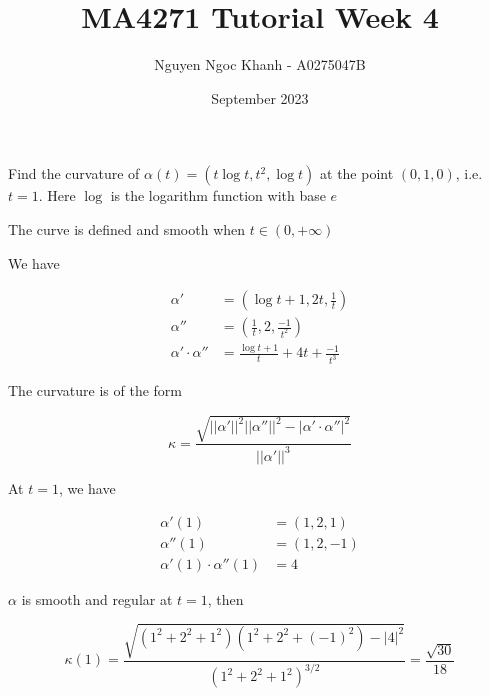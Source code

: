 \documentclass{article}
\title{
    MA4271 Tutorial Week 4
}
\author{Nguyen Ngoc Khanh - A0275047B}
\date{September 2023}
\begin{document}
\maketitle

\begin{problem}
    Find the curvature of $\alpha(t) = (t \log t, t^2, \log t)$ at the point $(0, 1, 0)$, i.e. $t = 1$. Here $\log$ is the logarithm function with base $e$
\end{problem}

The curve is defined and  smooth when $t \in (0, +\infty)$

We have

\begin{align*}
    \alpha' &= \left( \log t + 1, 2t, \frac{1}{t} \right) \\
    \alpha'' &= \left( \frac{1}{t}, 2, \frac{-1}{t^2} \right) \\
    \alpha' \cdot \alpha'' &= \frac{\log t + 1}{t} + 4t + \frac{-1}{t^3}
\end{align*}

The curvature is of the form

$$
    \kappa = \frac{\sqrt{||\alpha'||^2 ||\alpha''||^2 - |\alpha' \cdot \alpha''|^2}}{||\alpha'||^3}
$$

At $t = 1$, we have

\begin{align*}
    \alpha'(1) &= \left( 1, 2, 1 \right) \\
    \alpha''(1) &= \left( 1, 2, -1 \right) \\
    \alpha'(1) \cdot \alpha''(1) &= 4
\end{align*}

$\alpha$ is smooth and regular at $t = 1$, then

$$
    \kappa(1) = \frac{\sqrt{(1^2 + 2^2 + 1^2) (1^2 + 2^2 + (-1)^2) - |4|^2}}{(1^2 + 2^2 + 1^2)^{3/2}} = \frac{\sqrt{30}}{18 }
$$
\end{document}
